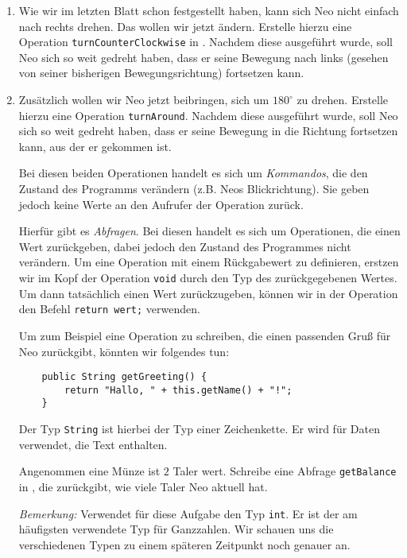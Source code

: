     \begin{enumerate}[label=\alph*)]
        \item
        Wie wir im letzten Blatt schon festgestellt haben, kann sich Neo nicht einfach nach rechts drehen. Das wollen wir jetzt ändern.
        Erstelle hierzu eine Operation \lstinline{turnCounterClockwise} in \ownclass. Nachdem diese ausgeführt wurde, soll Neo sich so weit gedreht haben, dass er seine Bewegung nach links (gesehen von seiner bisherigen Bewegungsrichtung) fortsetzen kann.
    
    
        \item
        Zusätzlich wollen wir Neo jetzt beibringen, sich um \(180^\circ\) zu drehen.
        Erstelle hierzu eine Operation \lstinline{turnAround}.
        Nachdem diese ausgeführt wurde, soll Neo sich so weit gedreht haben, dass er seine Bewegung in die Richtung fortsetzen kann, aus der er gekommen ist.
    
    
        Bei diesen beiden Operationen handelt es sich um \emph{Kommandos}, die den Zustand des Programms verändern (z.B. Neos Blickrichtung). Sie geben jedoch keine Werte an den Aufrufer der Operation zurück.
    
        Hierfür gibt es \emph{Abfragen}. Bei diesen handelt es sich um Operationen, die einen Wert zurückgeben, dabei jedoch den Zustand des Programmes nicht verändern. Um eine Operation mit einem Rückgabewert zu definieren, erstzen wir im Kopf der Operation \lstinline{void} durch den Typ des zurückgegebenen Wertes. Um dann tatsächlich einen Wert zurückzugeben, können wir in der Operation den Befehl \lstinline{return wert;} verwenden.
    
        Um zum Beispiel eine Operation zu schreiben, die einen passenden Gruß für Neo zurückgibt, könnten wir folgendes tun:
        \begin{lstlisting}
    public String getGreeting() {
        return "Hallo, " + this.getName() + "!";
    }
        \end{lstlisting}
        Der Typ \lstinline{String} ist hierbei der Typ einer Zeichenkette. Er wird für Daten verwendet, die Text enthalten.
    
        \excercise Angenommen eine Münze ist \(2\) Taler wert. Schreibe eine Abfrage
        \lstinline{getBalance} in \ownclass{}, die  zurückgibt, wie viele Taler Neo aktuell hat.
    
        \emph{Bemerkung:} Verwendet für diese Aufgabe den Typ \lstinline{int}. Er ist der am häufigsten verwendete Typ für Ganzzahlen. Wir schauen uns die verschiedenen Typen zu einem späteren Zeitpunkt noch genauer an.
    

\end{enumerate}
